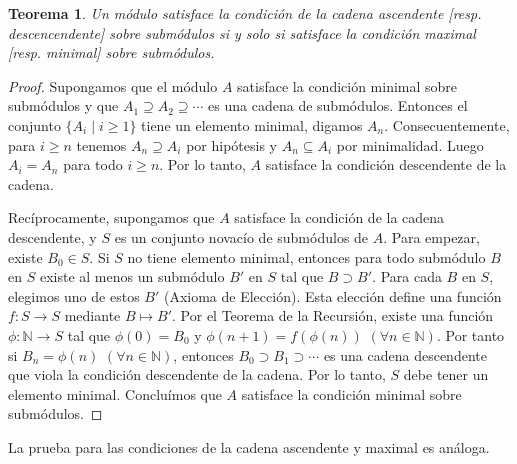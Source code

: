 \documentclass{report}
\newcommand{\naturalNumbers}{\mathbb{N}}
\newtheorem{theorem}{Teorema}
\begin{document}
  \begin{theorem}\label{theorem:equivalenceOfChainConditions}
    Un módulo satisface la condición de la cadena ascendente [resp. descencendente] sobre submódulos si y solo si satisface la condición maximal [resp. minimal] sobre submódulos.
  \end{theorem}
  \begin{proof}
    Supongamos que el módulo \(A\) satisface la condición minimal sobre submódulos y que \(A_1 \supseteq A_2 \supseteq \cdots\) es una cadena de submódulos.
    Entonces el conjunto \(\{A_i \mid i \geq 1\}\) tiene un elemento minimal, digamos \(A_n\).
    Consecuentemente, para \(i \geq n\) tenemos \(A_n \supseteq A_i\) por hipótesis y \(A_n \subseteq A_i\) por minimalidad. Luego \(A_i = A_n\) para todo \(i \geq n\).
    Por lo tanto, \(A\) satisface la condición descendente de la cadena.

    Recíprocamente, supongamos que \(A\) satisface la condición de la cadena descendente, y \(S\) es un conjunto novacío de submódulos de \(A\).
    Para empezar, existe \(B_0 \in S\).
    Si \(S\) no tiene elemento minimal, entonces para todo submódulo \(B\) en \(S\) existe al menos un submódulo \(B'\) en \(S\) tal que \(B \supset B'\).
    Para cada \(B\) en \(S\), elegimos uno de estos \(B'\) (Axioma de Elección).
    Esta elección define una función \(f : S \rightarrow S\) mediante \(B \mapsto B'\).
    Por el Teorema de la Recursión, existe una función \(\phi : \naturalNumbers \rightarrow S\) tal que \(\phi(0) = B_0\) y \(\phi(n + 1) = f(\phi(n))\) \((\forall n \in \naturalNumbers)\).
    Por tanto si \(B_n = \phi(n)\) \((\forall n \in \naturalNumbers)\), entonces \(B_0 \supset B_1 \supset \cdots\) es una cadena descendente que viola la condición descendente de la cadena.
    Por lo tanto, \(S\) debe tener un elemento minimal.
    Concluímos que \(A\) satisface la condición minimal sobre submódulos.
  \end{proof}
  La prueba para las condiciones de la cadena ascendente y maximal es análoga.
\end{document}

